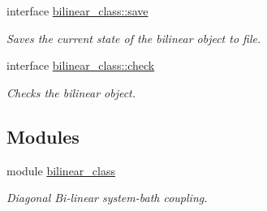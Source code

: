 \begin{DoxyCompactItemize}
interface \hyperlink{interfacebilinear__class_1_1save}{bilinear\+\_\+class\+::save}
\begin{DoxyCompactList}\small\item\em Saves the current state of the bilinear object to file. \end{DoxyCompactList}\item 
interface \hyperlink{interfacebilinear__class_1_1check}{bilinear\+\_\+class\+::check}
\begin{DoxyCompactList}\small\item\em Checks the bilinear object. \end{DoxyCompactList}\end{DoxyCompactItemize}
\subsection*{Modules}
\begin{DoxyCompactItemize}
\item 
module \hyperlink{namespacebilinear__class}{bilinear\+\_\+class}
\begin{DoxyCompactList}\small\item\em Diagonal Bi-\/linear system-\/bath coupling. \end{DoxyCompactList}\end{DoxyCompactItemize}
